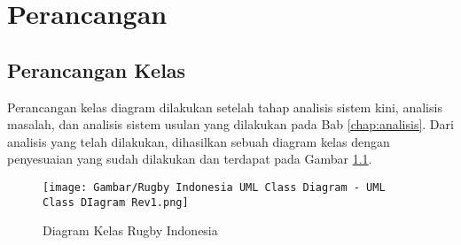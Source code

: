 \chapter{Perancangan}
\label{chap:perancangan}

\section{Perancangan Kelas}
Perancangan kelas diagram dilakukan setelah tahap analisis sistem kini, analisis masalah, dan analisis sistem usulan yang dilakukan pada Bab \ref{chap:analisis}. Dari analisis yang telah dilakukan, dihasilkan sebuah diagram kelas dengan penyesuaian yang sudah dilakukan dan terdapat pada Gambar \ref{fig:rugby-indonesia-class-diagram}.

\begin{figure} [H]
    \centering
    \texttt{[image: Gambar/Rugby Indonesia UML Class Diagram - UML Class DIagram Rev1.png]}
    \caption{Diagram Kelas Rugby Indonesia}
    \label{fig:rugby-indonesia-class-diagram}
\end{figure}

